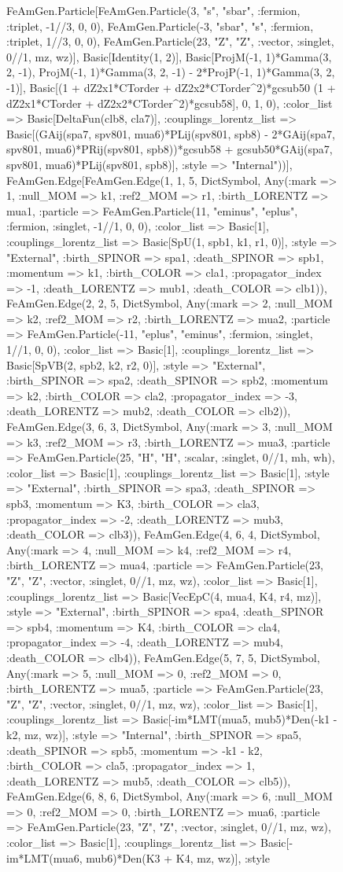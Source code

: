 \documentclass{revtex4}
\begin{document}
\begin{figure}[!htb]
\begin{center}
{FeAmGen.Particle[FeAmGen.Particle(3, "s", "sbar", :fermion, :triplet, -1//3, 0, 0), FeAmGen.Particle(-3, "sbar", "s", :fermion, :triplet, 1//3, 0, 0), FeAmGen.Particle(23, "Z", "Z", :vector, :singlet, 0//1, mz, wz)], Basic[Identity(1, 2)], Basic[ProjM(-1, 1)*Gamma(3, 2, -1), ProjM(-1, 1)*Gamma(3, 2, -1) - 2*ProjP(-1, 1)*Gamma(3, 2, -1)], Basic[(1 + dZ2x1*CTorder + dZ2x2*CTorder^2)*gcsub50 (1 + dZ2x1*CTorder + dZ2x2*CTorder^2)*gcsub58], 0, 1, 0), :color_list => Basic[DeltaFun(clb8, cla7)], :couplings_lorentz_list => Basic[(GAij(spa7, spv801, mua6)*PLij(spv801, spb8) - 2*GAij(spa7, spv801, mua6)*PRij(spv801, spb8))*gcsub58 + gcsub50*GAij(spa7, spv801, mua6)*PLij(spv801, spb8)], :style => "Internal"))], FeAmGen.Edge[FeAmGen.Edge(1, 1, 5, Dict{Symbol, Any}(:mark => 1, :null_MOM => k1, :ref2_MOM => r1, :birth_LORENTZ => mua1, :particle => FeAmGen.Particle(11, "eminus", "eplus", :fermion, :singlet, -1//1, 0, 0), :color_list => Basic[1], :couplings_lorentz_list => Basic[SpU(1, spb1, k1, r1, 0)], :style => "External", :birth_SPINOR => spa1, :death_SPINOR => spb1, :momentum => k1, :birth_COLOR => cla1, :propagator_index => -1, :death_LORENTZ => mub1, :death_COLOR => clb1)), FeAmGen.Edge(2, 2, 5, Dict{Symbol, Any}(:mark => 2, :null_MOM => k2, :ref2_MOM => r2, :birth_LORENTZ => mua2, :particle => FeAmGen.Particle(-11, "eplus", "eminus", :fermion, :singlet, 1//1, 0, 0), :color_list => Basic[1], :couplings_lorentz_list => Basic[SpVB(2, spb2, k2, r2, 0)], :style => "External", :birth_SPINOR => spa2, :death_SPINOR => spb2, :momentum => k2, :birth_COLOR => cla2, :propagator_index => -3, :death_LORENTZ => mub2, :death_COLOR => clb2)), FeAmGen.Edge(3, 6, 3, Dict{Symbol, Any}(:mark => 3, :null_MOM => k3, :ref2_MOM => r3, :birth_LORENTZ => mua3, :particle => FeAmGen.Particle(25, "H", "H", :scalar, :singlet, 0//1, mh, wh), :color_list => Basic[1], :couplings_lorentz_list => Basic[1], :style => "External", :birth_SPINOR => spa3, :death_SPINOR => spb3, :momentum => K3, :birth_COLOR => cla3, :propagator_index => -2, :death_LORENTZ => mub3, :death_COLOR => clb3)), FeAmGen.Edge(4, 6, 4, Dict{Symbol, Any}(:mark => 4, :null_MOM => k4, :ref2_MOM => r4, :birth_LORENTZ => mua4, :particle => FeAmGen.Particle(23, "Z", "Z", :vector, :singlet, 0//1, mz, wz), :color_list => Basic[1], :couplings_lorentz_list => Basic[VecEpC(4, mua4, K4, r4, mz)], :style => "External", :birth_SPINOR => spa4, :death_SPINOR => spb4, :momentum => K4, :birth_COLOR => cla4, :propagator_index => -4, :death_LORENTZ => mub4, :death_COLOR => clb4)), FeAmGen.Edge(5, 7, 5, Dict{Symbol, Any}(:mark => 5, :null_MOM => 0, :ref2_MOM => 0, :birth_LORENTZ => mua5, :particle => FeAmGen.Particle(23, "Z", "Z", :vector, :singlet, 0//1, mz, wz), :color_list => Basic[1], :couplings_lorentz_list => Basic[-im*LMT(mua5, mub5)*Den(-k1 - k2, mz, wz)], :style => "Internal", :birth_SPINOR => spa5, :death_SPINOR => spb5, :momentum => -k1 - k2, :birth_COLOR => cla5, :propagator_index => 1, :death_LORENTZ => mub5, :death_COLOR => clb5)), FeAmGen.Edge(6, 8, 6, Dict{Symbol, Any}(:mark => 6, :null_MOM => 0, :ref2_MOM => 0, :birth_LORENTZ => mua6, :particle => FeAmGen.Particle(23, "Z", "Z", :vector, :singlet, 0//1, mz, wz), :color_list => Basic[1], :couplings_lorentz_list => Basic[-im*LMT(mua6, mub6)*Den(K3 + K4, mz, wz)], :style }
\end{center}
\end{figure}
\end{document}
